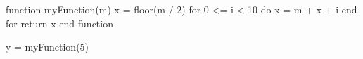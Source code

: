 
function myFunction(m)
  x = floor(m / 2)
  for 0 <= i < 10 do
    x = m + x + i
  end for
  return x
end function

y = myFunction(5)
